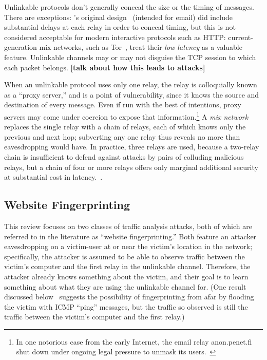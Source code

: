 \documentclass{zarticle}
\def\todo#1{{\color{todocolor}\bfseries [#1]}}
\begin{document}
Unlinkable protocols don't generally conceal the size or the timing of
messages.  There are exceptions: \citeauthor{chaum1981mix}'s original
design~\cite{chaum1981mix} (intended for email) did include
substantial delays at each relay in order to conceal timing, but this
is not considered acceptable for modern interactive protocols such as
HTTP: current-generation mix networks, such as
Tor~\cite{dingledine2004tor}, treat their \emph{low latency} as a
valuable feature.  Unlinkable channels may or may not disguise the TCP
session to which each packet belongs. \todo{talk about how this leads
  to attacks}

When an unlinkable protocol uses only one relay, the relay is
colloquially known as a “proxy server,” and is a point of
vulnerability, since it knows the source and destination of every
message.  Even if run with the best of intentions, proxy servers may
come under coercion to expose that information.\footnote{In one
  notorious case from the early Internet, the email relay
  \textsf{anon.penet.fi} shut down under ongoing legal pressure to
  unmask its users.~\cite{newman1996church}} A \emph{mix
  network}~\cite{chaum1981mix} replaces the single relay with a chain
of relays, each of which knows only the previous and next hop;
subverting any one relay thus reveals no more than eavesdropping would
have.  In practice, three relays are used, because a two-relay chain
is insufficient to defend against attacks by pairs of colluding
malicious relays, but a chain of four or more relays offers only
marginal additional security at substantial cost in
latency.~\cite{wright2002analysis,wright2003defending}.

\subsection{Website Fingerprinting}

This review focuses on two classes of traffic analysis attacks, both
of which are referred to in the literature as “website
fingerprinting.”  Both feature an attacker eavesdropping on a
victim-user at or near the victim's location in the network;
specifically, the attacker is assumed to be able to observe traffic
between the victim's computer and the first relay in the unlinkable
channel.  Therefore, the attacker already knows something about the
victim, and their goal is to learn something about what they are using
the unlinkable channel for.  (One result discussed
below~\cite{gong2011remote} suggests the possibility of fingerprinting
from afar by flooding the victim with ICMP “ping” messages, but the
traffic so observed is still the traffic between the victim's computer
and the first relay.)
\end{document}
